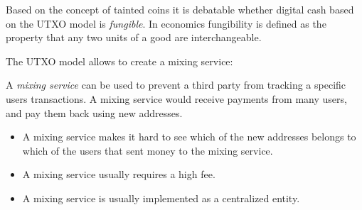 \begin{note}
Based on the concept of tainted coins it is debatable whether digital cash based on the UTXO model is \emph{fungible}. In economics fungibility is defined as the property that any two units of a good are interchangeable.
\end{note}


The UTXO model allows to create a mixing service:
\begin{definition}
	A \emph{mixing service} can be used to prevent a third party from tracking a specific users transactions. A mixing service would receive payments from many users, and pay them back using new addresses. 
\end{definition}

\begin{note}
	\begin{itemize}
		\item A mixing service makes it hard to see which of the new addresses belongs to which of the users that sent money to the mixing service.
		\item A mixing service usually requires a high fee.
		\item A mixing service is usually implemented as a centralized entity.
	\end{itemize}
\end{note}